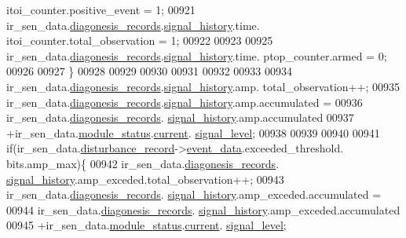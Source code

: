 \begin{DoxyCode}
      itoi\_counter.positive\_event     = 1;
00921                  ir\_sen\_data.\hyperlink{a00023_a7ae905b560513ad201e58c2f63375030}{diagonesis\_records}.\hyperlink{a00017_affb63906d23cb1cb7787d61eaaedfb60}{signal\_history}.time.
      itoi\_counter.total\_observation  = 1;
00922 
00923 
00925                  ir\_sen\_data.\hyperlink{a00023_a7ae905b560513ad201e58c2f63375030}{diagonesis\_records}.\hyperlink{a00017_affb63906d23cb1cb7787d61eaaedfb60}{signal\_history}.time.
      ptop\_counter.armed              = 0;
00926 
00927          \}
00928 
00929 
00930              
00931 
00932 
00933 
00934              ir\_sen\_data.\hyperlink{a00023_a7ae905b560513ad201e58c2f63375030}{diagonesis\_records}.\hyperlink{a00017_affb63906d23cb1cb7787d61eaaedfb60}{signal\_history}.amp.
      total\_observation++;
00935              ir\_sen\_data.\hyperlink{a00023_a7ae905b560513ad201e58c2f63375030}{diagonesis\_records}.\hyperlink{a00017_affb63906d23cb1cb7787d61eaaedfb60}{signal\_history}.amp.accumulated 
      =
00936                      ir\_sen\_data.\hyperlink{a00023_a7ae905b560513ad201e58c2f63375030}{diagonesis\_records}.
      \hyperlink{a00017_affb63906d23cb1cb7787d61eaaedfb60}{signal\_history}.amp.accumulated
00937                      +ir\_sen\_data.\hyperlink{a00023_a5a53c391562b059eb744ac679f3765ca}{module\_status}.\hyperlink{a00017_ab8af48cdbba92b3ae39c4470e53af944}{current}.
      \hyperlink{a00017_abcdf2bc0c2e5a14863938ae28c3bc96e}{signal\_level};
00938 
00939 
00940 
00941              \textcolor{keywordflow}{if}(ir\_sen\_data.\hyperlink{a00023_ac9b38e2c1d3f1013a88d33506c754152}{disturbance\_record}->\hyperlink{a00028_a8c0bda69e71ef674e60da47ad0be9ab0}{event\_data}.exceeded\_threshold.
      bits.amp\_max)\{
00942                     ir\_sen\_data.\hyperlink{a00023_a7ae905b560513ad201e58c2f63375030}{diagonesis\_records}.
      \hyperlink{a00017_affb63906d23cb1cb7787d61eaaedfb60}{signal\_history}.amp\_exceded.total\_observation++;
00943                     ir\_sen\_data.\hyperlink{a00023_a7ae905b560513ad201e58c2f63375030}{diagonesis\_records}.
      \hyperlink{a00017_affb63906d23cb1cb7787d61eaaedfb60}{signal\_history}.amp\_exceded.accumulated =
00944                      ir\_sen\_data.\hyperlink{a00023_a7ae905b560513ad201e58c2f63375030}{diagonesis\_records}.
      \hyperlink{a00017_affb63906d23cb1cb7787d61eaaedfb60}{signal\_history}.amp\_exceded.accumulated
00945                      +ir\_sen\_data.\hyperlink{a00023_a5a53c391562b059eb744ac679f3765ca}{module\_status}.\hyperlink{a00017_ab8af48cdbba92b3ae39c4470e53af944}{current}.
      \hyperlink{a00017_abcdf2bc0c2e5a14863938ae28c3bc96e}{signal\_level};

\end{DoxyCode}
